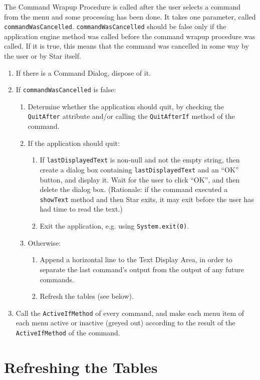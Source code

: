 \documentclass[11pt]{article}
\begin{document}
The Command Wrapup Procedure is called after the user selects a
command from the menu and some processing has been done.  It takes
one parameter, called {\tt commandWasCancelled}.  {\tt commandWasCancelled}
should be false only if the application engine method was called before
the command wrapup procedure was called.  If it is true, this means that
the command was cancelled in some way by the user or by Star itself.
\begin{enumerate}
\item If there is a Command Dialog, dispose of it.
\item If {\tt commandWasCancelled} is false:
  \begin{enumerate}
  \item Determine whether the application should quit, by checking
    the {\tt QuitAfter} attribute and/or calling the {\tt QuitAfterIf}
    method of the command.
  \item If the application should quit:
    \begin{enumerate}
    \item If {\tt lastDisplayedText} is non-null and not the empty string,
      then create a dialog box containing {\tt lastDisplayedText} and
      an ``OK'' button, and display it.  Wait for the user to
      click ``OK'', and then delete the dialog box.
      (Rationale:  if the command executed a {\tt showText} method and
      then Star exits, it may exit before the user has had time to
      read the text.)
    \item Exit the application, e.g. using {\tt System.exit(0)}.
    \end{enumerate}
  \item Otherwise:
    \begin{enumerate}
    \item Append a horizontal line to the Text Display Area, in order to
      separate the last command's output from the output of any
      future commands.
    \item Refresh the tables (see below).
    \end{enumerate}
  \end{enumerate}
\item Call the {\tt ActiveIfMethod} of every command, and make each
  menu item of each menu active or inactive (greyed out) according to
  the result of the {\tt ActiveIfMethod} of the command.
\end{enumerate}

\section{Refreshing the Tables}
\end{document}
